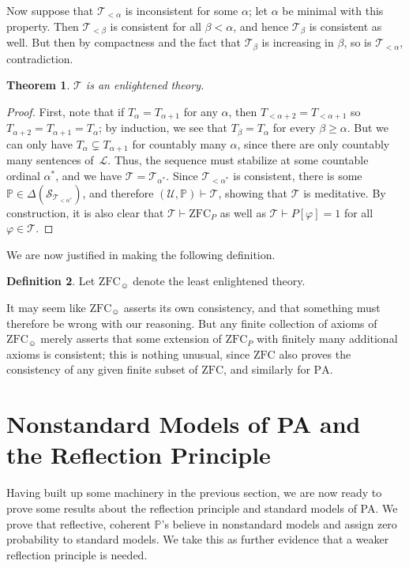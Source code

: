 \documentclass[12pt]{article}
\newcommand{\PP}{\mathbb{P}}
\newcommand{\zfc}{\mathrm{ZFC}}
\newcommand{\zfcp}{{\zfc_P}}
\newcommand{\zfch}{{\zfc_{\smiley}}}
\newcommand{\pa}{\mathrm{PA}}
\newcommand{\cL}{\mathcal{L}}
\newcommand{\cS}{\mathcal{S}}
\newcommand{\cT}{\mathcal{T}}
\newcommand{\cU}{\mathcal{U}}
\theoremstyle{plain}
\newtheorem{theorem}{Theorem}[subsection]
\theoremstyle{definition}
\newtheorem{definition}[theorem]{Definition}
\theoremstyle{remark}
\begin{document}
Now suppose that $\cT_{<\alpha}$ is inconsistent for some $\alpha$; let $\alpha$ be minimal with this property. Then $\cT_{<\beta}$ is consistent for all $\beta<\alpha$, and hence $\cT_\beta$ is consistent as well. But then by compactness and the fact that $\cT_\beta$ is increasing in $\beta$, so is $\cT_{<\alpha}$, contradiction.
\begin{theorem}
$\cT$ is an enlightened theory.
\end{theorem}
\begin{proof}
First, note that if $T_{\alpha}= T_{\alpha+1}$ for any $\alpha$, then $T_{<\alpha+2} = T_{<\alpha+1}$ so $T_{\alpha+2} = T_{\alpha+1} = T_\alpha$; by induction, we see that $T_\beta = T_\alpha$ for every $\beta\ge\alpha$. But we can only have $T_{\alpha}\subsetneq T_{\alpha+1}$ for countably many $\alpha$, since there are only countably many sentences of~$\cL$. Thus, the sequence must stabilize at some countable ordinal $\alpha^*$, and we have $\cT = \cT_{\alpha^*}$. Since $\cT_{<\alpha^*}$ is consistent, there is some $\PP\in\Delta(\cS_{\cT_{<\alpha^*}})$, and therefore $(\cU,\PP)\vdash\cT$, showing that $\cT$ is meditative. By construction, it is also clear that $\cT\vdash\zfcp$ as well as $\cT\vdash P[\varphi]=1$ for all $\varphi\in\cT$.
\end{proof}
We are now justified in making the following definition.
\begin{definition}
Let $\zfch$ denote the least enlightened theory.
\end{definition}
It may seem like $\zfch$ asserts its own consistency, and that something must therefore be wrong with our reasoning. But any finite collection of axioms of $\zfch$ merely asserts that some extension of $\zfcp$ with finitely many additional axioms is consistent; this is nothing unusual, since $\zfc$ also proves the consistency of any given finite subset of $\zfc$, and similarly for $\pa$.
\section{Nonstandard Models of PA and the Reflection Principle}
\label{nonstandard-models}
Having built up some machinery in the previous section, we are now ready to prove some results about the reflection principle and standard models of PA. We prove that reflective, coherent $\PP$'s believe in nonstandard models and assign zero probability to standard models. We take this as further evidence that a weaker reflection principle is needed.
\end{document}
